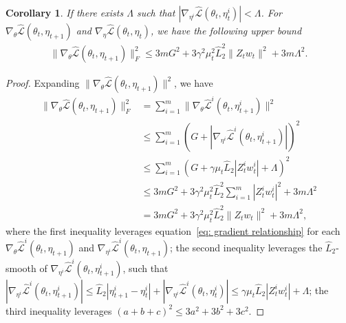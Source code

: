 \documentclass[twoside]{article} %
\def\eqref#1{equation~\ref{#1}}
\theoremstyle{plain}
\newtheorem{corollary}[theorem]{Corollary}
\theoremstyle{definition}
\theoremstyle{remark}
\newcommand{\hL}{\hat{L}}
\newcommand{\fhL}{\hat{\mathcal{L}}}
\begin{document}
\begin{corollary}
If there exists $\Lambda$ such that $|\nabla_{\eta^i}\fhL(\theta_t, \eta_{t}^i)|<\Lambda$. For $\nabla_{\theta}\fhL(\theta_{t},\eta_{t+1})$ and $\nabla_{\eta} \fhL(\theta_t, \eta_{t})$, we have the following upper bound
    \begin{align}
        \|\nabla_{\theta}\fhL(\theta_t,\eta_{t+1})\|_F^2\leq 3mG^2 + 3\gamma^2\mu_t^2\hL_2^2 \|Z_tw_t\|^2+3m\Lambda^2.
        \label{eq: gradient relationship 2}
    \end{align}
\end{corollary}
\begin{proof}
    Expanding $\|\nabla_{\theta}\fhL(\theta_t, \eta_{t+1})\|^2$, we have
    \begin{align}
        \|\nabla_{\theta}\fhL(\theta_t, \eta_{t+1})\|_F^2&=\sum_{i=1}^{m}\|\nabla_{\theta}\fhL^i(\theta_t, \eta_{t+1}^i) \|^2\nonumber\\
        &\leq \sum_{i=1}^{m}(G+|\nabla_{\eta^i}\fhL^i(\theta_t, \eta_{t+1}^i)|)^2\nonumber\\
        &\leq \sum_{i=1}^{m}(G+\gamma\mu_t\hL_2|Z_t^iw_t^i|+\Lambda)^2\nonumber\\
        &\leq 3mG^2+3\gamma^2\mu_t^2\hL_2^2\sum_{i=1}^{m}|Z_t^iw_t^i|^2 + 3m\Lambda^2 \nonumber\\
        &= 3mG^2 + 3\gamma^2\mu_t^2\hL_2^2 \|Z_tw_t\|^2+3m\Lambda^2,
    \end{align}
    where the first inequality leverages \eqref{eq: gradient relationship} for each $\nabla_{\theta}\fhL^i(\theta_t, \eta_{t+1})$ and $\nabla_{\eta^i}\fhL^i(\theta_t, \eta_{t+1})$; the second inequality leverages the $\hL_2$-smooth of $\nabla_{\eta^i}\fhL^i(\theta_t, \eta_{t+1}^i)$, such that $|\nabla_{\eta^i}\fhL^i(\theta_t, \eta_{t+1}^i)|\leq \hL_2|\eta_{t+1}^i-\eta_{t}^i|+|\nabla_{\eta^i}\fhL^i(\theta_t, \eta_{t}^i)|\leq \gamma\mu_t\hL_2|Z_t^iw_t^i|+\Lambda$; the third inequality leverages $(a+b+c)^2\leq 3a^2+3b^2+3c^2$.
\end{proof}
\end{document}
